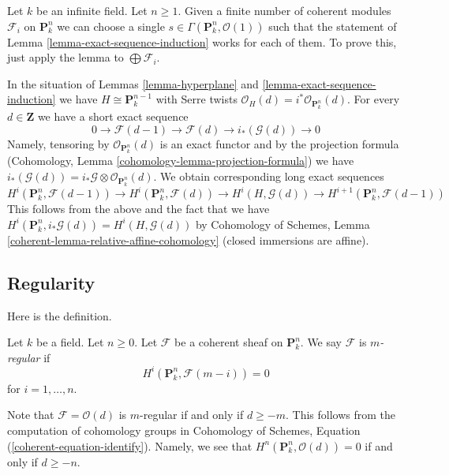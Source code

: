 \begin{remark}
\label{remark-exact-sequence-induction}
Let $k$ be an infinite field. Let $n \geq 1$. Given a finite number
of coherent modules $\mathcal{F}_i$ on $\mathbf{P}^n_k$ we can choose
a single $s \in \Gamma(\mathbf{P}^n_k, \mathcal{O}(1))$ such
that the statement of Lemma \ref{lemma-exact-sequence-induction}
works for each of them.
To prove this, just apply the lemma to $\bigoplus \mathcal{F}_i$.
\end{remark}

\begin{remark}
\label{remark-exact-sequence-induction-cohomology}
In the situation of Lemmas \ref{lemma-hyperplane} and
\ref{lemma-exact-sequence-induction}
we have $H \cong \mathbf{P}^{n - 1}_k$ with Serre twists
$\mathcal{O}_H(d) = i^*\mathcal{O}_{\mathbf{P}^n_k}(d)$.
For every $d \in \mathbf{Z}$ we have a short exact sequence
$$
0 \to \mathcal{F}(d - 1) \to \mathcal{F}(d) \to i_*(\mathcal{G}(d)) \to 0
$$
Namely, tensoring by $\mathcal{O}_{\mathbf{P}^n_k}(d)$ is an
exact functor and by the projection formula
(Cohomology, Lemma \ref{cohomology-lemma-projection-formula})
we have
$i_*(\mathcal{G}(d)) = i_*\mathcal{G} \otimes \mathcal{O}_{\mathbf{P}^n_k}(d)$.
We obtain corresponding long exact sequences
$$
H^i(\mathbf{P}^n_k, \mathcal{F}(d - 1)) \to
H^i(\mathbf{P}^n_k, \mathcal{F}(d)) \to
H^i(H, \mathcal{G}(d)) \to
H^{i + 1}(\mathbf{P}^n_k, \mathcal{F}(d - 1))
$$
This follows from the above and the fact that we have
$H^i(\mathbf{P}^n_k, i_*\mathcal{G}(d)) = H^i(H, \mathcal{G}(d))$ by
Cohomology of Schemes, Lemma \ref{coherent-lemma-relative-affine-cohomology}
(closed immersions are affine).
\end{remark}





\subsection{Regularity}
\label{subsection-regularity}

\noindent
Here is the definition.

\begin{definition}
\label{definition-regularity}
Let $k$ be a field. Let $n \geq 0$. Let $\mathcal{F}$ be a coherent
sheaf on $\mathbf{P}^n_k$. We say $\mathcal{F}$ is {\it $m$-regular}
if
$$
H^i(\mathbf{P}^n_k, \mathcal{F}(m - i)) = 0
$$
for $i = 1, \ldots, n$.
\end{definition}

\noindent
Note that $\mathcal{F} = \mathcal{O}(d)$ is $m$-regular if and only
if $d \geq -m$. This follows from the computation of cohomology groups
in Cohomology of Schemes, Equation (\ref{coherent-equation-identify}).
Namely, we see that $H^n(\mathbf{P}^n_k, \mathcal{O}(d)) = 0$
if and only if $d \geq -n$.

